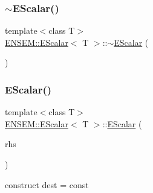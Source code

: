 \mbox{\label{classENSEM_1_1EScalar_addb090b46c2b6abdff79eb52bad58091}} 
\subsubsection{\texorpdfstring{$\sim$EScalar()}{~EScalar()}\hspace{0.1cm}{\footnotesize\ttfamily [1/2]}}
{\footnotesize\ttfamily template$<$class T$>$ \\
\mbox{\hyperlink{classENSEM_1_1EScalar}{E\+N\+S\+E\+M\+::\+E\+Scalar}}$<$ T $>$\+::$\sim$\mbox{\hyperlink{classENSEM_1_1EScalar}{E\+Scalar}} (\begin{DoxyParamCaption}{ }\end{DoxyParamCaption})\hspace{0.3cm}{\ttfamily [inline]}}

\mbox{\label{classENSEM_1_1EScalar_ad064adaa15e67106893182ba57c6fd91}} 
\subsubsection{\texorpdfstring{EScalar()}{EScalar()}\hspace{0.1cm}{\footnotesize\ttfamily [2/12]}}
{\footnotesize\ttfamily template$<$class T$>$ \\
\mbox{\hyperlink{classENSEM_1_1EScalar}{E\+N\+S\+E\+M\+::\+E\+Scalar}}$<$ T $>$\+::\mbox{\hyperlink{classENSEM_1_1EScalar}{E\+Scalar}} (\begin{DoxyParamCaption}\item[{const typename \mbox{\hyperlink{structENSEM_1_1WordType}{Word\+Type}}$<$ T $>$\+::Type\+\_\+t \&}]{rhs }\end{DoxyParamCaption})\hspace{0.3cm}{\ttfamily [inline]}}



construct dest = const 

